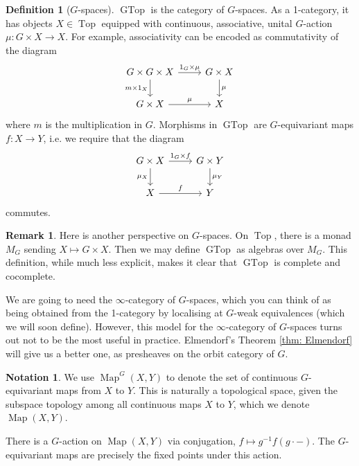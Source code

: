 \documentclass{amsart}
\theoremstyle{definition}
\newtheorem{defn}[thm]{Definition}
\newtheorem{remark}[thm]{Remark}
\newtheorem{ntn}[thm]{Notation}
\numberwithin{thm}{section}
\def\Map{\operatorname{Map}}
\def\GTop{\operatorname{GTop}}
\def\Top{\operatorname{Top}}
\begin{document}
\begin{defn}[$G$-spaces] $\GTop$ is the category of $G$-spaces. As a 1-category, it has objects $X \in \Top$ equipped with continuous, associative, unital $G$-action $\mu: G \times X \to X$. For example, associativity can be encoded as commutativity of the diagram
    \[\begin{tikzcd}
        G \times G \times X \arrow[r, "1_G \times \mu"] \arrow[d, "m \times 1_X"'] & G \times X \arrow[d, "\mu"] \\
        G \times X \arrow[r, "\mu"]                                                & X                          
        \end{tikzcd}\] 
    where $m$ is the multiplication in $G$. Morphisms in $\GTop$ are $G$-equivariant maps $f: X \to Y$, i.e. we require that the diagram 
    \[\begin{tikzcd}
        G \times X \arrow[r, "1_G \times f"] \arrow[d, "\mu_X"'] & G \times Y \arrow[d, "\mu_Y"] \\
        X \arrow[r, "f"]                                         & Y                            
        \end{tikzcd}\]
        commutes.
\end{defn}

\begin{remark}
    Here is another perspective on $G$-spaces. On $\Top$, there is a monad $M_G$ sending $X \mapsto G \times X$. Then we may define $\GTop$ as algebras over $M_G$. This definition, while much less explicit, makes it clear that $\GTop$ is complete and cocomplete.
\end{remark}

We are going to need the $\infty$-category of $G$-spaces, which you can think of as being obtained from the 1-category by localising at $G$-weak equivalences (which we will soon define). However, this model for the $\infty$-category of $G$-spaces turns out not to be the most useful in practice. Elmendorf's Theorem \ref{thm: Elmendorf} will give us a better one, as presheaves on the orbit category of $G$.

\begin{ntn} We use $\Map^G(X, Y)$ to denote the set of continuous $G$-equivariant maps from $X$ to $Y$. This is naturally a topological space, given the subspace topology among all continuous maps $X$ to $Y$, which we denote $\Map(X, Y)$. 
\end{ntn}

There is a $G$-action on $\Map(X, Y)$ via conjugation, $f \mapsto g^{-1}f(g \cdot -)$. The $G$-equivariant maps are precisely the fixed points under this action.
\end{document}
